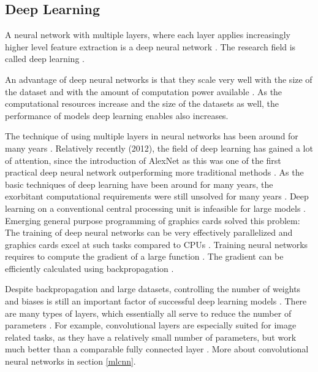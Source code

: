\documentclass[draft,final,oneside]{vutinfth} %
\begin{document}
\subsection{Deep Learning} \label{dlbackground}

A neural network with multiple layers, where each layer applies increasingly higher level feature extraction is a deep neural network \cite{deeplearninginneuralnetworks}. The research field is called deep learning \cite{deeplearninginneuralnetworks}.

An advantage of deep neural networks is that they scale very well with the size of the dataset and with the amount of computation power available \cite{alexnet}. As the computational resources increase and the size of the datasets as well, the performance of models deep learning enables also increases.

The technique of using multiple layers in neural networks has been around for many years \cite{deeplearninginneuralnetworks}. Relatively recently (2012), the field of deep learning has gained a lot of attention, since the introduction of AlexNet \cite{alexnet} as this was one of the first practical deep neural network outperforming more traditional methods \cite{deeplearninginneuralnetworks}. As the basic techniques of deep learning have been around for many years, the exorbitant computational requirements were still unsolved for many years \cite{deeplearninginneuralnetworks}. Deep learning on a conventional central processing unit is infeasible for large models \cite{deeplearninginneuralnetworks}. Emerging general purpose programming of graphics cards solved this problem: The training of deep neural networks can be very effectively parallelized and graphics cards excel at such tasks compared to CPUs \cite{Goodfellow-et-al-2016}. Training neural networks requires to compute the gradient of a large function \cite{Goodfellow-et-al-2016}. The gradient can be efficiently calculated using backpropagation \cite{aimodern}. %

Despite backpropagation and large datasets, controlling the number of weights and biases is still an important factor of successful deep learning models \cite{deeplearninginneuralnetworks}. There are many types of layers, which essentially all serve to reduce the number of parameters \cite{Goodfellow-et-al-2016}. For example, convolutional layers are especially suited for image related tasks, as they have a relatively small number of parameters, but work much better than a comparable fully connected layer \cite{deeplearninginneuralnetworks}. More about convolutional neural networks in section \ref{mlcnn}.
\end{document}
